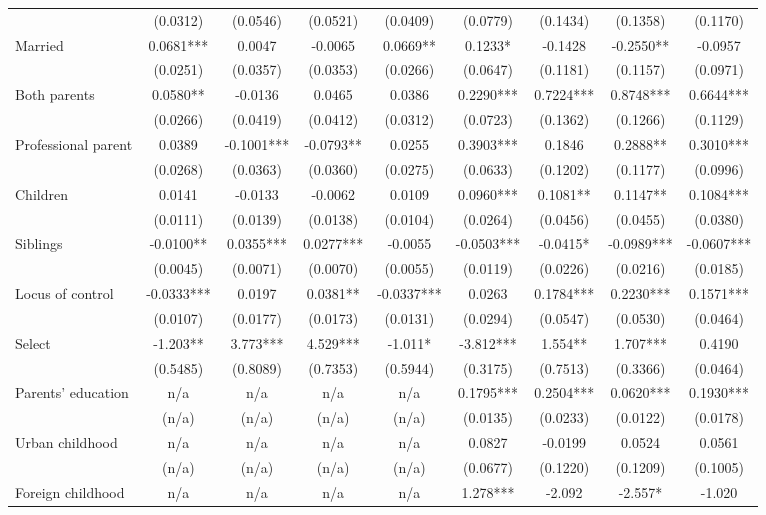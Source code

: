 \documentclass[12pt]{report}
\begin{document}
\begin{sidewaystable}
\begin{tabular}{lc|c|c|c|c|c|c|c}
& (0.0312) & (0.0546) & (0.0521) & (0.0409) & (0.0779) & (0.1434) & (0.1358) & (0.1170)\\
Married & 0.0681*** & 0.0047 & -0.0065 & 0.0669** & 0.1233* & -0.1428 & -0.2550** & -0.0957\\
& (0.0251) & (0.0357) & (0.0353) & (0.0266) & (0.0647) & (0.1181) & (0.1157) & (0.0971)\\
Both parents & 0.0580** & -0.0136 & 0.0465 & 0.0386 & 0.2290*** & 0.7224*** & 0.8748*** & 0.6644***\\
& (0.0266) & (0.0419) & (0.0412) & (0.0312) & (0.0723) & (0.1362) & (0.1266) & (0.1129)\\
Professional parent & 0.0389 & -0.1001*** & -0.0793** & 0.0255 & 0.3903*** & 0.1846 & 0.2888** & 0.3010***\\
& (0.0268) & (0.0363) & (0.0360) & (0.0275) & (0.0633) & (0.1202) & (0.1177) & (0.0996)\\
Children & 0.0141 & -0.0133 & -0.0062 & 0.0109 & 0.0960*** & 0.1081** & 0.1147** & 0.1084***\\
& (0.0111) & (0.0139) & (0.0138) & (0.0104) & (0.0264) & (0.0456) & (0.0455) & (0.0380)\\
Siblings & -0.0100** & 0.0355*** & 0.0277*** & -0.0055 & -0.0503*** & -0.0415* & -0.0989*** & -0.0607***\\
& (0.0045) & (0.0071) & (0.0070) & (0.0055) & (0.0119) & (0.0226) & (0.0216) & (0.0185)\\
Locus of control & -0.0333*** & 0.0197 & 0.0381** & -0.0337*** & 0.0263 & 0.1784*** & 0.2230*** & 0.1571***\\
& (0.0107) & (0.0177) & (0.0173) & (0.0131) & (0.0294) & (0.0547) & (0.0530) & (0.0464)\\
Select & -1.203** & 3.773*** & 4.529*** & -1.011* & -3.812*** & 1.554** & 1.707*** & 0.4190\\
& (0.5485) & (0.8089) & (0.7353) & (0.5944) & (0.3175) & (0.7513) & (0.3366) & (0.0464)\\
Parents' education & n/a & n/a & n/a & n/a & 0.1795*** & 0.2504*** & 0.0620*** & 0.1930***\\
& (n/a) & (n/a) & (n/a) & (n/a) & (0.0135) & (0.0233) & (0.0122) & (0.0178)\\
Urban childhood & n/a & n/a & n/a & n/a & 0.0827 & -0.0199 & 0.0524 & 0.0561\\
& (n/a) & (n/a) & (n/a) & (n/a) & (0.0677) & (0.1220) & (0.1209) & (0.1005)\\
Foreign childhood & n/a & n/a & n/a & n/a & 1.278*** & -2.092 & -2.557* & -1.020\\

\end{tabular}
\end{sidewaystable}
\end{document}

